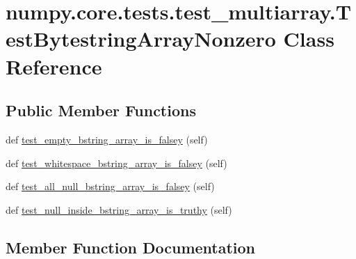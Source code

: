 \hypertarget{classnumpy_1_1core_1_1tests_1_1test__multiarray_1_1TestBytestringArrayNonzero}{}\section{numpy.\+core.\+tests.\+test\+\_\+multiarray.\+Test\+Bytestring\+Array\+Nonzero Class Reference}
\label{classnumpy_1_1core_1_1tests_1_1test__multiarray_1_1TestBytestringArrayNonzero}
\subsection*{Public Member Functions}
\begin{DoxyCompactItemize}
\item 
def \hyperlink{classnumpy_1_1core_1_1tests_1_1test__multiarray_1_1TestBytestringArrayNonzero_a3ba9e512175c3788995b465ca05ab910}{test\+\_\+empty\+\_\+bstring\+\_\+array\+\_\+is\+\_\+falsey} (self)
\item 
def \hyperlink{classnumpy_1_1core_1_1tests_1_1test__multiarray_1_1TestBytestringArrayNonzero_a60282b0a389b40973d17303cbea89958}{test\+\_\+whitespace\+\_\+bstring\+\_\+array\+\_\+is\+\_\+falsey} (self)
\item 
def \hyperlink{classnumpy_1_1core_1_1tests_1_1test__multiarray_1_1TestBytestringArrayNonzero_a85bf86d31849eecc5b2a8d88b3e0c1bf}{test\+\_\+all\+\_\+null\+\_\+bstring\+\_\+array\+\_\+is\+\_\+falsey} (self)
\item 
def \hyperlink{classnumpy_1_1core_1_1tests_1_1test__multiarray_1_1TestBytestringArrayNonzero_a767369306c1e4cae179d4a6dc940af31}{test\+\_\+null\+\_\+inside\+\_\+bstring\+\_\+array\+\_\+is\+\_\+truthy} (self)
\end{DoxyCompactItemize}


\subsection{Member Function Documentation}
\mbox{\label{classnumpy_1_1core_1_1tests_1_1test__multiarray_1_1TestBytestringArrayNonzero_a85bf86d31849eecc5b2a8d88b3e0c1bf}} 
